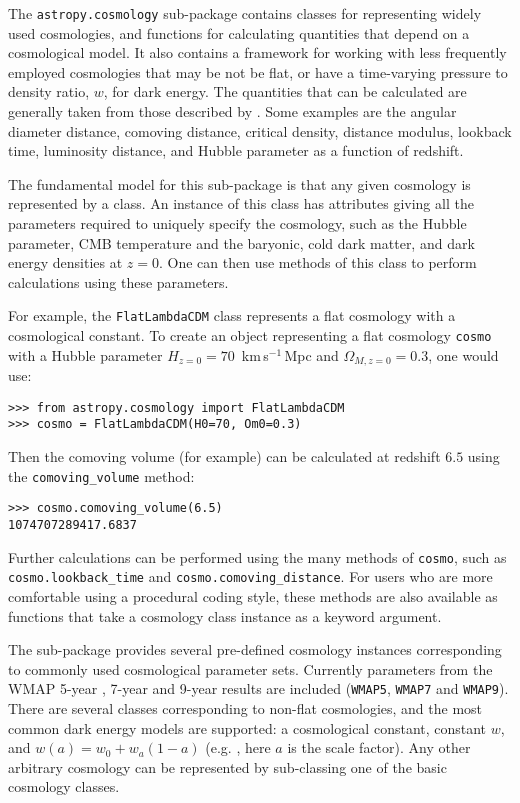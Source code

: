 \documentclass[traditabstract]{aa}
\begin{document}

The \texttt{astropy.cosmology} sub-package contains classes for
representing widely used cosmologies, and functions for calculating
quantities that depend on a cosmological model. It also contains a
framework for working with less frequently employed cosmologies that
may be not be flat, or have a time-varying pressure to density ratio,
$w$, for dark energy. The quantities that can be calculated are
generally taken from those described by \citet{Hogg99}. Some examples
are the angular diameter distance, comoving distance, critical
density, distance modulus, lookback time, luminosity distance, and
Hubble parameter as a function of redshift.

The fundamental model for this sub-package is that any given cosmology
is represented by a class. An instance of this class has attributes
giving all the parameters required to uniquely specify the cosmology,
such as the Hubble parameter, CMB temperature and the baryonic, cold
dark matter, and dark energy densities at $z=0$. One can then use
methods of this class to perform calculations using these parameters.

For example, the \texttt{FlatLambdaCDM} class represents a flat
cosmology with a cosmological constant. To create an object
representing a flat cosmology \texttt{cosmo} with a Hubble parameter
$H_{z=0} = 70$~km\,s$^{-1}$\,Mpc and $\Omega_{M,z=0} = 0.3$, one would
use:

\begin{verbatim}
>>> from astropy.cosmology import FlatLambdaCDM
>>> cosmo = FlatLambdaCDM(H0=70, Om0=0.3)
\end{verbatim}

\noindent Then the comoving volume (for example) can be calculated at
redshift $6.5$ using the \texttt{comoving\_volume} method:

\begin{verbatim}
>>> cosmo.comoving_volume(6.5)
1074707289417.6837
\end{verbatim}

\noindent Further calculations can be performed using the many methods
of \texttt{cosmo}, such as \texttt{cosmo.lookback\_time} and
\texttt{cosmo.comoving\_distance}.  For users who are more comfortable
using a procedural coding style, these methods are also available as
functions that take a cosmology class instance as a keyword argument.

The sub-package provides several pre-defined cosmology instances
corresponding to commonly used cosmological parameter sets. Currently
parameters from the WMAP 5-year \citep{Komatsu09}, 7-year
\citep{Komatsu11} and 9-year results \citep{Hinshaw13} are included
(\texttt{WMAP5}, \texttt{WMAP7} and \texttt{WMAP9}). There are several
classes corresponding to non-flat cosmologies, and the most common
dark energy models are supported: a cosmological constant, constant
$w$, and $w(a) = w_0 + w_a (1-a)$ (e.g. \citealt{Linder03}, here $a$
is the scale factor). Any other arbitrary cosmology can be represented
by sub-classing one of the basic cosmology classes.
\end{document}

